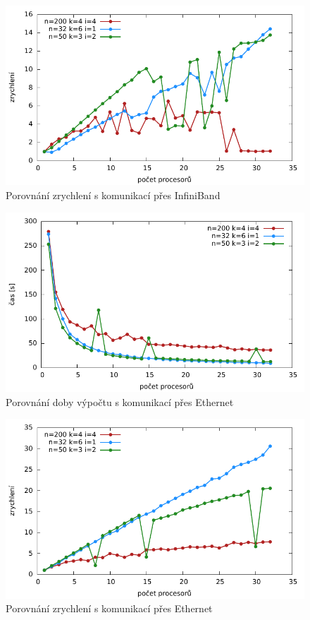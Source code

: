 \documentclass[12pt]{article}
\begin{document}
\begin{figure}
	\caption{Porovnání zrychlení s komunikací přes InfiniBand}
	\includegraphics{graphs/speedup-ib.pdf}
\end{figure}

\begin{figure}
	\caption{Porovnání doby výpočtu s komunikací přes Ethernet}
	\includegraphics{graphs/time-eth.pdf}
\end{figure}

\begin{figure}
	\caption{Porovnání zrychlení s komunikací přes Ethernet}
	\includegraphics{graphs/speedup-eth.pdf}
\end{figure}
\end{document}
